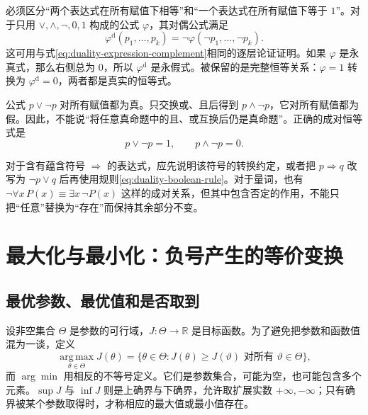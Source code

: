 \documentclass[UTF8]{ctexart}
\begin{document}
必须区分“两个表达式在所有赋值下相等”和“一个表达式在所有赋值下等于 $1$”。对于只用 $\lor,\land,\neg,0,1$ 构成的公式 $\varphi$，其对偶公式满足
\begin{equation}
 \varphi^{\mathrm d}(p_1,\ldots,p_k)
 =\neg\varphi(\neg p_1,\ldots,\neg p_k).
 \label{eq:duality-boolean-complement}
\end{equation}
这可用与式\eqref{eq:duality-expression-complement}相同的逐层论证证明。如果 $\varphi$ 是永真式，那么右侧总为 $0$，所以 $\varphi^{\mathrm d}$ 是永假式。被保留的是完整恒等关系：$\varphi=1$ 转换为 $\varphi^{\mathrm d}=0$，两者都是真实的恒等式。

\begin{example}[排中律与矛盾律]
公式 $p\lor\neg p$ 对所有赋值都为真。只交换或、且后得到 $p\land\neg p$，它对所有赋值都为假。因此，不能说“将任意真命题中的且、或互换后仍是真命题”。正确的成对恒等式是
\[
 p\lor\neg p=1,
 \qquad p\land\neg p=0.
\]
\end{example}

对于含有蕴含符号 $\Rightarrow$ 的表达式，应先说明该符号的转换约定，或者把 $p\Rightarrow q$ 改写为 $\neg p\lor q$ 后再使用规则\eqref{eq:duality-boolean-rule}。对于量词，也有 $\neg\forall x\,P(x)\equiv\exists x\,\neg P(x)$ 这样的成对关系，但其中包含否定的作用，不能只把“任意”替换为“存在”而保持其余部分不变。

\section{最大化与最小化：负号产生的等价变换}
\label{sec:duality-sign}

\subsection{最优参数、最优值和是否取到}

设非空集合 $\Theta$ 是参数的可行域，$J:\Theta\to\mathbb R$ 是目标函数。为了避免把参数和函数值混为一谈，定义
\[
 \operatorname*{arg\,max}_{\theta\in\Theta}J(\theta)
 =\{\theta\in\Theta: J(\theta)\geq J(\vartheta)\text{ 对所有 }\vartheta\in\Theta\},
\]
而 $\arg\min$ 用相反的不等号定义。它们是参数集合，可能为空，也可能包含多个元素。$\sup J$ 与 $\inf J$ 则是上确界与下确界，允许取扩展实数 $+\infty,-\infty$；只有确界被某个参数取得时，才称相应的最大值或最小值存在。
\end{document}
